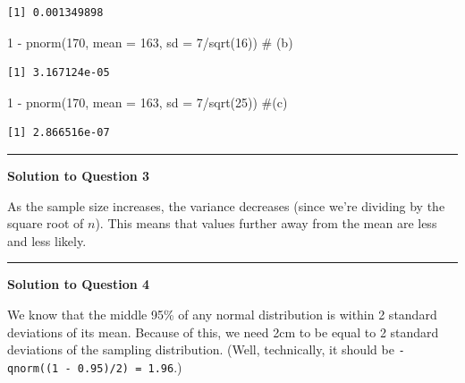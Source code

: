 \documentclass[
  letterpaper,
  DIV=11,
  numbers=noendperiod,
  oneside]{scrreprt}
\newenvironment{Shaded}{\begin{snugshade}}{\end{snugshade}}
\newcommand{\AttributeTok}[1]{\textcolor[rgb]{0.40,0.45,0.13}{#1}}
\newcommand{\CommentTok}[1]{\textcolor[rgb]{0.37,0.37,0.37}{#1}}
\newcommand{\DecValTok}[1]{\textcolor[rgb]{0.68,0.00,0.00}{#1}}
\newcommand{\FunctionTok}[1]{\textcolor[rgb]{0.28,0.35,0.67}{#1}}
\newcommand{\NormalTok}[1]{\textcolor[rgb]{0.00,0.23,0.31}{#1}}
\newcommand{\SpecialCharTok}[1]{\textcolor[rgb]{0.37,0.37,0.37}{#1}}
\begin{document}
\begin{verbatim}
[1] 0.001349898
\end{verbatim}

\begin{Shaded}
\begin{Highlighting}[]
\DecValTok{1} \SpecialCharTok{{-}} \FunctionTok{pnorm}\NormalTok{(}\DecValTok{170}\NormalTok{, }\AttributeTok{mean =} \DecValTok{163}\NormalTok{, }\AttributeTok{sd =} \DecValTok{7}\SpecialCharTok{/}\FunctionTok{sqrt}\NormalTok{(}\DecValTok{16}\NormalTok{)) }\CommentTok{\# (b)}
\end{Highlighting}
\end{Shaded}

\begin{verbatim}
[1] 3.167124e-05
\end{verbatim}

\begin{Shaded}
\begin{Highlighting}[]
\DecValTok{1} \SpecialCharTok{{-}} \FunctionTok{pnorm}\NormalTok{(}\DecValTok{170}\NormalTok{, }\AttributeTok{mean =} \DecValTok{163}\NormalTok{, }\AttributeTok{sd =} \DecValTok{7}\SpecialCharTok{/}\FunctionTok{sqrt}\NormalTok{(}\DecValTok{25}\NormalTok{)) }\CommentTok{\#(c)}
\end{Highlighting}
\end{Shaded}

\begin{verbatim}
[1] 2.866516e-07
\end{verbatim}

\begin{center}\rule{0.5\linewidth}{0.5pt}\end{center}

\textbf{Solution to Question 3}

As the sample size increases, the variance decreases (since we're
dividing by the square root of \(n\)). This means that values further
away from the mean are less and less likely.

\begin{center}\rule{0.5\linewidth}{0.5pt}\end{center}

\textbf{Solution to Question 4}

We know that the middle 95\% of any normal distribution is within 2
standard deviations of its mean. Because of this, we need 2cm to be
equal to 2 standard deviations of the sampling distribution. (Well,
technically, it should be \texttt{-qnorm((1\ -\ 0.95)/2)\ =\ 1.96}.)
\end{document}
